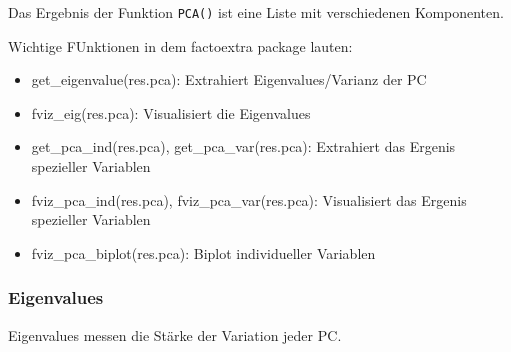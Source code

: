 \documentclass[
]{article}
\providecommand{\tightlist}{%
  \setlength{\itemsep}{0pt}\setlength{\parskip}{0pt}}
\begin{document}
Das Ergebnis der Funktion \texttt{PCA()} ist eine Liste mit verschiedenen Komponenten.

Wichtige FUnktionen in dem factoextra package lauten:

\begin{itemize}
\tightlist
\item
  get\_eigenvalue(res.pca): Extrahiert Eigenvalues/Varianz der PC
\item
  fviz\_eig(res.pca): Visualisiert die Eigenvalues
\item
  get\_pca\_ind(res.pca), get\_pca\_var(res.pca): Extrahiert das Ergenis spezieller Variablen
\item
  fviz\_pca\_ind(res.pca), fviz\_pca\_var(res.pca): Visualisiert das Ergenis spezieller Variablen
\item
  fviz\_pca\_biplot(res.pca): Biplot individueller Variablen
\end{itemize}

\hypertarget{eigenvalues}{%
\subsubsection{Eigenvalues}\label{eigenvalues}}

Eigenvalues messen die Stärke der Variation jeder PC.
\end{document}
